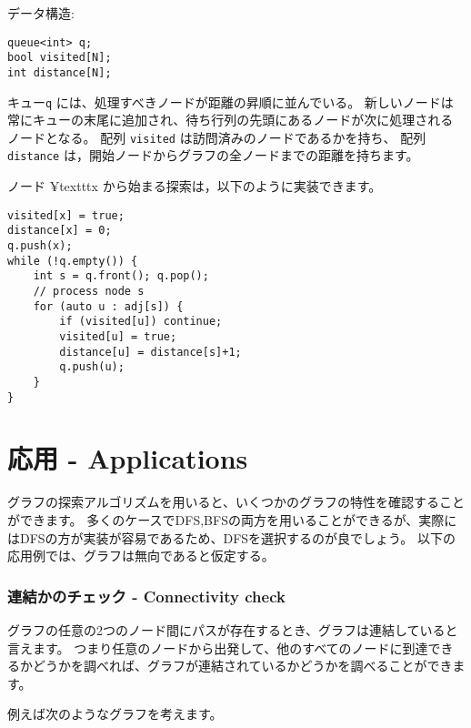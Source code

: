 データ構造:
\begin{lstlisting}
queue<int> q;
bool visited[N];
int distance[N];
\end{lstlisting}

キュー\texttt{q} には、処理すべきノードが距離の昇順に並んでいる。
新しいノードは常にキューの末尾に追加され、待ち行列の先頭にあるノードが次に処理されるノードとなる。
配列 \texttt{visited} は訪問済みのノードであるかを持ち、
配列 \texttt{distance} は，開始ノードからグラフの全ノードまでの距離を持ちます。

ノード ¥texttt{x} から始まる探索は，以下のように実装できます。
\begin{lstlisting}
visited[x] = true;
distance[x] = 0;
q.push(x);
while (!q.empty()) {
    int s = q.front(); q.pop();
    // process node s
    for (auto u : adj[s]) {
        if (visited[u]) continue;
        visited[u] = true;
        distance[u] = distance[s]+1;
        q.push(u);
    }
}
\end{lstlisting}


\section{応用 - Applications}


グラフの探索アルゴリズムを用いると、いくつかのグラフの特性を確認することができます。
多くのケースでDFS,BFSの両方を用いることができるが、実際にはDFSの方が実装が容易であるため、DFSを選択するのが良でしょう。
以下の応用例では、グラフは無向であると仮定する。

\subsubsection{連結かのチェック - Connectivity check}


グラフの任意の2つのノード間にパスが存在するとき、グラフは連結していると言えます。
つまり任意のノードから出発して、他のすべてのノードに到達できるかどうかを調べれば、グラフが連結されているかどうかを調べることができます。

例えば次のようなグラフを考えます。
\begin{center}
\end{center}

